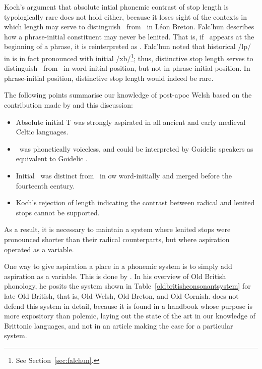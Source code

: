 Koch's argument that absolute intial phonemic contrast of stop length is typologically rare does not hold either, because it loses sight of the contexts in which length may serve to distinguish \lT\ from \xD\ in Léon Breton. Falc'hun describes how a phrase-initial constituent may never be lenited. That is, if \lT\ appears at the beginning of a phrase, it is reinterpreted as \xD. Falc'hun  noted that historical /\gls{l}p/ in  is in fact pronounced with initial /\gls{x}b/\footnote{See Section~\ref{sec:falchun}.}; thus, distinctive stop length serves to distinguish \lT\ from \xD\ in word-initial position, but not in phrase-initial position. In phrase-initial position, distinctive stop length would indeed be rare. %

The following points summarise our knowledge of post-\gls{apoc} Welsh based on the contribution made by \textcite{koch_*cothairche_1990} and this discussion:
\begin{itemize}
\item Absolute initial \gls{T} was strongly aspirated in all ancient and early medieval Celtic languages.
\item \lT\ was phonetically voiceless, and could be interpreted by Goidelic speakers as equivalent to Goidelic \lT.
\item Initial \lT\ was distinct from \xD\ in \gls{ow} word-initially and merged before the fourteenth century.
\item Koch's rejection of  length indicating the contrast between radical and lenited stops cannot be supported.
\end{itemize}
As a result, it is necessary to maintain a system where lenited stops were pronounced shorter than their radical counterparts, but where aspiration operated as a variable.

One way to give aspiration a place in a phonemic system is to simply add aspiration as a variable. This is done by \textcite{schrijver_old_2011}. In his overview of Old British phonology, he posits the system shown in Table~\ref{oldbritishconsonantsystem} for late Old British, that is, Old Welsh, Old Breton, and Old Cornish. \Textcite[31]{schrijver_old_2011} does not defend this system in detail, because it is found in a handbook whose purpose is more expository than polemic, laying out the state of the art in our knowledge of Brittonic languages, and not in an article making the case for a particular system.

